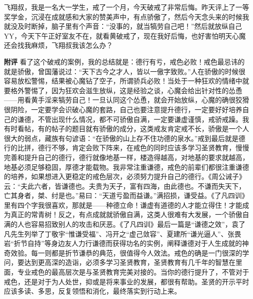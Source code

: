 \begin{case}
    飞翔叔，我是一名大一学生，戒了一个月，今天破戒了非常后悔。昨天评上了一等奖学金，沉浸在成就感和大家的赞美声中，有点骄傲了，然后今天念头来的时候我就没及时断掉，脑子里有个声音：“没事的，就当犒劳自己吧！”然后就放纵自己 YY，今天下午正好室友不在，就看黄破戒了，现在我好后悔，也好害怕明天心魔还会找我麻烦，飞翔叔我该怎么办？

    \textbf{附评} 看了这个破戒的案例，我的总结就是：德行有亏，戒色必败！戒色最忌讳的就是骄傲，曾国藩说过：“天下古今之才人，皆以一傲字致败。”人在骄傲的时候很容易放松警惕，结果被心魔钻了空子，所谓骄兵必败！当处于一种狂欢的情绪中就要格外警惕了，因为狂欢会滋生放纵，这是经验之谈，心魔会给出针对性的怂恿——用看黄手淫来犒劳自己！一旦认同这个怂恿，就会开始放纵，心魔的确很狡猾很阴险，一定要学会识破心魔的套路，自己也要注意提升德行，一定要好好培养自己的谦德，不管出现什么情况，都不可骄傲自满，一定要谦虚谨慎，戒骄戒躁。我有时看帖，有的帖子的题目就有骄傲的成分，这类戒友肯定戒不长，骄傲是一个人很大的弱点，藏族有句谚语：“在骄傲的山上存不住功德的泉水。”戒到最后就是德行的比拼，德行不够，肯定会败下阵来，在戒色的同时应该多学习圣贤教育，慢慢完善和提升自己的德行，德行就像地基一样，楼造得越高，对地基的要求就越高，地基必须足够稳固，厚德才能载物。我非常注重谦德，戒色的前辈们都很注重谦德的培养，如果想进入更稳定的戒色层次，必须努力提升自己的德行。《周公诫子》云：“夫此六者，皆谦德也。夫贵为天子，富有四海，由此德也。不谦而失天下，亡其身者，桀、纣是也。”易曰：“天道亏盈而益谦。”满招损，谦受益。《了凡四训》里有四个字我很喜欢，那就是——种德立命！谦虚有道德的人才能立得住！才能成为真正的常青树！反之，有点成就就骄傲自满，这类人很难有大发展，一个骄傲自满的人也容易招致别人的攻击和厌恶。《了凡四训》最后一篇是“谦德之效”，袁了凡先生列举了丁敬宇“惟谦受福”、冯开之“虚己敛容”、夏建所“谦光逼人”、张畏岩“折节自持”等身边友人力行谦德而获得功名的实例，阐释谦德对于人生成就的神奇效验。每一则都是折节谦恭的典范，很值得今人效法。戒色的确是一门很深的学问，要达到更高深的造诣，必须多学习圣贤教育，圣贤教育有几千年的智慧在里面，专业戒色的最高层次是与圣贤教育完美对接的。当你的德行提升了，不管对于戒色，还是对于为人处世，抑或是将来事业的发展，都很有帮助。圣贤的开示平时应该多读、多思，反复领悟和消化，最终落实到行动上来。
\end{case}

